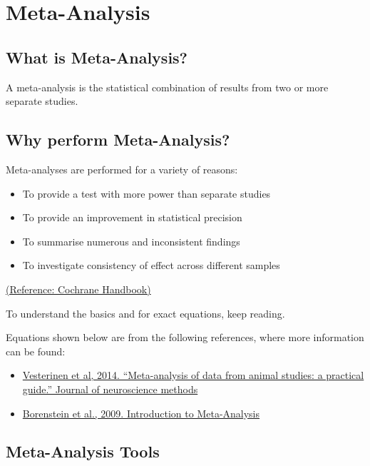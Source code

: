 \documentclass[
]{book}
\providecommand{\tightlist}{%
  \setlength{\itemsep}{0pt}\setlength{\parskip}{0pt}}
\begin{document}
\hypertarget{meta-analysis}{%
\chapter{Meta-Analysis}\label{meta-analysis}}

\hypertarget{what-is-meta-analysis}{%
\section{What is Meta-Analysis?}\label{what-is-meta-analysis}}

A meta-analysis is the statistical combination of results from two or more separate studies.

\hypertarget{why-perform-meta-analysis}{%
\section{Why perform Meta-Analysis?}\label{why-perform-meta-analysis}}

Meta-analyses are performed for a variety of reasons:

\begin{itemize}
\tightlist
\item
  To provide a test with more power than separate studies
\item
  To provide an improvement in statistical precision
\item
  To summarise numerous and inconsistent findings
\item
  To investigate consistency of effect across different samples
\end{itemize}

\href{https://training.cochrane.org/handbook/current}{(Reference: Cochrane Handbook)}

To understand the basics and for exact equations, keep reading.

Equations shown below are from the following references, where more information can be found:

\begin{itemize}
\tightlist
\item
  \href{https://doi.org/10.1016/j.jneumeth.2013.09.010}{Vesterinen et al, 2014. ``Meta-analysis of data from animal studies: a practical guide.'' Journal of neuroscience methods}
\item
  \href{https://doi.org/10.1002/9780470743386}{Borenstein et al., 2009. Introduction to Meta-Analysis}
\end{itemize}

\hypertarget{meta-analysis-tools}{%
\section{Meta-Analysis Tools}\label{meta-analysis-tools}}
\end{document}
